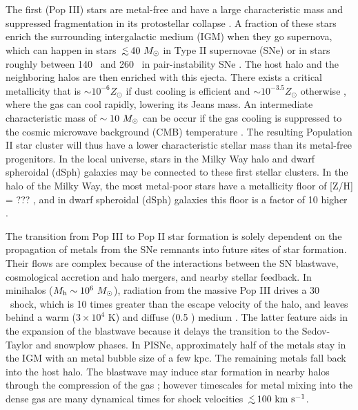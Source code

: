 \documentclass[apjl]{emulateapj}
\begin{document}
The first (Pop III) stars are metal-free and have a large
characteristic mass and suppressed fragmentation in its protostellar
collapse \citep{Abel00, ABN02, Bromm02_P3, Yoshida03, OShea07a}.  A
fraction of these stars enrich the surrounding intergalactic medium
(IGM) when they go supernova, which can happen in stars $\lsim40~\Ms$
in Type II supernovae (SNe) or in stars roughly between 140 \Ms~and
260 \Ms~in pair-instability SNe \citep[PISNe;][]{2002ApJ...567..532H}.
The host halo and the neighboring halos are then enriched with this
ejecta.  There exists a critical metallicity that is $\sim 10^{-6}
Z_\odot$ if dust cooling is efficient \citep{Omukai05,
  Schneider06_Frag, clark08} and $\sim 10^{-3.5} Z_\odot$ otherwise
\citep{Bromm01, 2009ApJ...691..441S}, where the gas can cool rapidly,
lowering its Jeans mass.  An intermediate characteristic mass of
$\sim10~\Ms$ can be occur if the gas cooling is suppressed to the
cosmic microwave background (CMB) temperature \citep{Larson98,
  Tumlinson07_IMF, 2009ApJ...691..441S}.  The resulting Population II
star cluster will thus have a lower characteristic stellar mass than
its metal-free progenitors.  In the local universe, stars in the Milky
Way halo and dwarf spheroidal (dSph) galaxies may be connected to
these first stellar clusters.  In the halo of the Milky Way, the most
metal-poor stars have a metallicity floor of [Z/H] = ???  \citep{ref},
and in dwarf spheroidal (dSph) galaxies this floor is a factor of 10
higher \citep{refs}.

The transition from Pop III to Pop II star formation is solely
dependent on the propagation of metals from the SNe remnants into
future sites of star formation.  Their flows are complex because of
the interactions between the SN blastwave, cosmological accretion and
halo mergers, and nearby stellar feedback.  In minihalos ($M_{\rm h}
\sim 10^6~\Ms$), radiation from the massive Pop III drives a 30
\kms~shock, which is 10 times greater than the escape velocity of the
halo, and leaves behind a warm ($3 \times 10^4$ K) and diffuse (0.5
\cubecm) medium \citep{Kitayama04, Whalen04, Abel07}.  The latter
feature aids in the expansion of the blastwave because it delays the
transition to the Sedov-Taylor and snowplow phases.  In PISNe,
approximately half of the metals stay in the IGM with an metal bubble
size of a few kpc.  The remaining metals fall back into the host halo.
The blastwave may induce star formation in nearby halos through the
compression of the gas \citep{Ferrara98}; however timescales for metal
mixing into the dense gas are many dynamical times \citep{Cen07} for
shock velocities $\lsim 100~\kms$.
\end{document}
